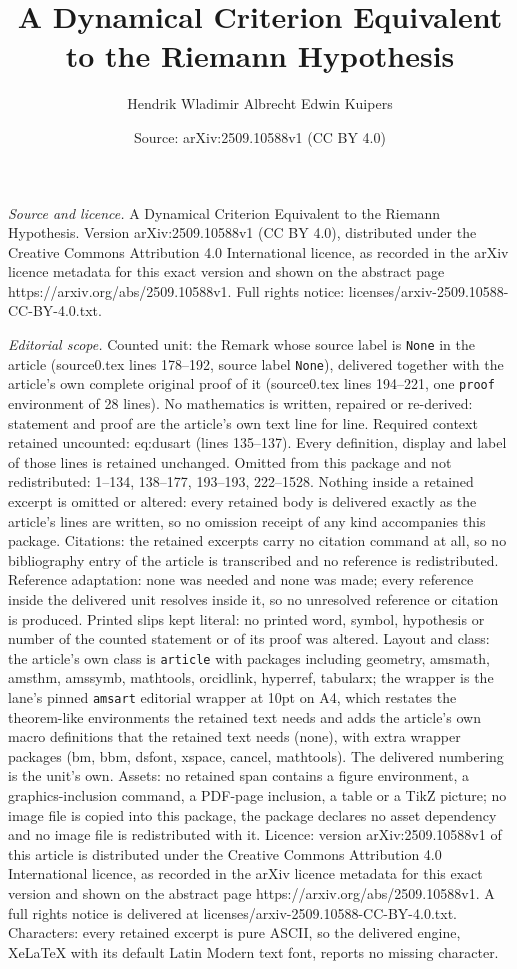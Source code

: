 \documentclass[10pt,a4paper]{amsart}
\title[A Dynamical Criterion Equivalent to the Riemann Hypothesis]{A Dynamical Criterion Equivalent to the Riemann Hypothesis}
\author{Hendrik Wladimir Albrecht Edwin Kuipers}
\date{Source: arXiv:2509.10588v1 (CC BY 4.0)}
\begin{document}
\maketitle

\noindent\emph{Source and licence.} A Dynamical Criterion Equivalent to the Riemann Hypothesis. Version arXiv:2509.10588v1 (CC BY 4.0), distributed under the Creative Commons Attribution 4.0 International licence, as recorded in the arXiv licence metadata for this exact version and shown on the abstract page https://arxiv.org/abs/2509.10588v1. Full rights notice: licenses/arxiv-2509.10588-CC-BY-4.0.txt.\par\smallskip

\noindent\textit{Editorial scope.} Counted unit: the Remark whose source label is \texttt{None} in the article (source0.tex lines 178--192, source label \texttt{None}), delivered together with the article's own complete original proof of it (source0.tex lines 194--221, one \texttt{proof} environment of 28 lines). No mathematics is written, repaired or re-derived: statement and proof are the article's own text line for line. Required context retained uncounted: eq:dusart (lines 135--137). Every definition, display and label of those lines is retained unchanged. Omitted from this package and not redistributed: 1--134, 138--177, 193--193, 222--1528. Nothing inside a retained excerpt is omitted or altered: every retained body is delivered exactly as the article's lines are written, so no omission receipt of any kind accompanies this package. Citations: the retained excerpts carry no citation command at all, so no bibliography entry of the article is transcribed and no reference is redistributed. Reference adaptation: none was needed and none was made; every reference inside the delivered unit resolves inside it, so no unresolved reference or citation is produced. Printed slips kept literal: no printed word, symbol, hypothesis or number of the counted statement or of its proof was altered. Layout and class: the article's own class is \texttt{article} with packages including geometry, amsmath, amsthm, amssymb, mathtools, orcidlink, hyperref, tabularx; the wrapper is the lane's pinned \texttt{amsart} editorial wrapper at 10pt on A4, which restates the theorem-like environments the retained text needs and adds the article's own macro definitions that the retained text needs (none), with extra wrapper packages (bm, bbm, dsfont, xspace, cancel, mathtools). The delivered numbering is the unit's own. Assets: no retained span contains a figure environment, a graphics-inclusion command, a PDF-page inclusion, a table or a TikZ picture; no image file is copied into this package, the package declares no asset dependency and no image file is redistributed with it. Licence: version arXiv:2509.10588v1 of this article is distributed under the Creative Commons Attribution 4.0 International licence, as recorded in the arXiv licence metadata for this exact version and shown on the abstract page https://arxiv.org/abs/2509.10588v1. A full rights notice is delivered at licenses/arxiv-2509.10588-CC-BY-4.0.txt. Characters: every retained excerpt is pure ASCII, so the delivered engine, XeLaTeX with its default Latin Modern text font, reports no missing character.
\end{document}
